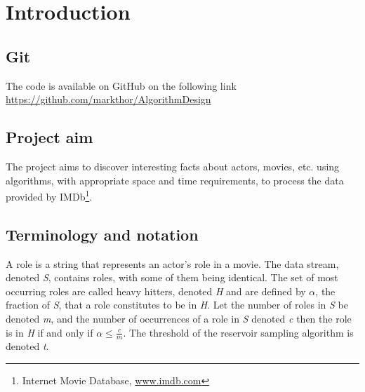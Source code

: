 
\section{Introduction}

\subsection{Git}
The code is available on GitHub on the following link \url{https://github.com/markthor/AlgorithmDesign}

\subsection{Project aim}
The project aims to discover interesting facts about actors, movies, etc. using algorithms, with appropriate space and time requirements, to process the data provided by IMDb\footnote{Internet Movie Database, \url{www.imdb.com}}.

\subsection{Terminology and notation}
A role is a string that represents an actor’s role in a movie. The data stream, denoted \textit{S}, contains roles, with some of them being identical. The set of most occurring roles are called heavy hitters, denoted \textit{H} and are defined by \(\alpha\), the fraction of \textit{S}, that a role constitutes to be in \textit{H}.
Let the number of roles in \textit{S} be denoted \textit{m}, and the number of occurrences of a role in \textit{S} denoted \textit{c} then the role is in \textit{H} if and only if 
\begin{math}
	\alpha \le \frac{c}{m}
\end{math}. The threshold of the reservoir sampling algorithm is denoted \textit{t}.

